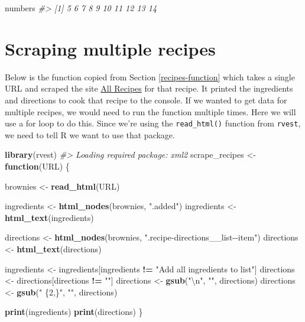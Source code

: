 \documentclass[
  12pt,
]{book}
\newenvironment{Shaded}{\begin{snugshade}}{\end{snugshade}}
\newcommand{\CharTok}[1]{\textcolor[rgb]{0.5,0.5,0.5}{#1}}
\newcommand{\CommentTok}[1]{\textcolor[rgb]{0.37,0.37,0.37}{\textit{#1}}}
\newcommand{\ControlFlowTok}[1]{\textcolor[rgb]{0.27,0.27,0.27}{\textbf{#1}}}
\newcommand{\KeywordTok}[1]{\textcolor[rgb]{0.27,0.27,0.27}{\textbf{#1}}}
\newcommand{\NormalTok}[1]{#1}
\newcommand{\OperatorTok}[1]{\textcolor[rgb]{0.43,0.43,0.43}{\textbf{#1}}}
\newcommand{\StringTok}[1]{\textcolor[rgb]{0.5,0.5,0.5}{#1}}
\begin{document}
\begin{Shaded}
\begin{Highlighting}[]
\NormalTok{numbers}
\CommentTok{\#>  [1]  5  6  7  8  9 10 11 12 13 14}
\end{Highlighting}
\end{Shaded}

\hypertarget{scraping-multiple-recipes}{%
\section{Scraping multiple recipes}\label{scraping-multiple-recipes}}

Below is the function copied from Section \ref{recipes-function} which takes a single URL and scraped the site \href{https://www.allrecipes.com/}{All Recipes} for that recipe. It printed the ingredients and directions to cook that recipe to the console. If we wanted to get data for multiple recipes, we would need to run the function multiple times. Here we will use a for loop to do this. Since we're using the \texttt{read\_html()} function from \texttt{rvest}, we need to tell R we want to use that package.

\begin{Shaded}
\begin{Highlighting}[]
\KeywordTok{library}\NormalTok{(rvest)}
\CommentTok{\#> Loading required package: xml2}
\NormalTok{scrape\_recipes <{-}}\StringTok{ }\ControlFlowTok{function}\NormalTok{(URL) \{}
  
\NormalTok{  brownies <{-}}\StringTok{ }\KeywordTok{read\_html}\NormalTok{(URL)}
  
\NormalTok{  ingredients <{-}}\StringTok{ }\KeywordTok{html\_nodes}\NormalTok{(brownies, }\StringTok{".added"}\NormalTok{)}
\NormalTok{  ingredients <{-}}\StringTok{ }\KeywordTok{html\_text}\NormalTok{(ingredients)}
  
\NormalTok{  directions <{-}}\StringTok{ }\KeywordTok{html\_nodes}\NormalTok{(brownies, }\StringTok{".recipe{-}directions\_\_list{-}{-}item"}\NormalTok{)}
\NormalTok{  directions <{-}}\StringTok{ }\KeywordTok{html\_text}\NormalTok{(directions)}
  
\NormalTok{  ingredients <{-}}\StringTok{ }\NormalTok{ingredients[ingredients }\OperatorTok{!=}\StringTok{ "Add all ingredients to list"}\NormalTok{]}
\NormalTok{  directions  <{-}}\StringTok{ }\NormalTok{directions[directions }\OperatorTok{!=}\StringTok{ ""}\NormalTok{]}
\NormalTok{  directions  <{-}}\StringTok{ }\KeywordTok{gsub}\NormalTok{(}\StringTok{"}\CharTok{\textbackslash{}n}\StringTok{"}\NormalTok{, }\StringTok{""}\NormalTok{, directions)}
\NormalTok{  directions  <{-}}\StringTok{ }\KeywordTok{gsub}\NormalTok{(}\StringTok{" \{2,\}"}\NormalTok{, }\StringTok{""}\NormalTok{, directions)}
  
  \KeywordTok{print}\NormalTok{(ingredients)}
  \KeywordTok{print}\NormalTok{(directions)}
\NormalTok{\}}
\end{Highlighting}
\end{Shaded}
\end{document}
